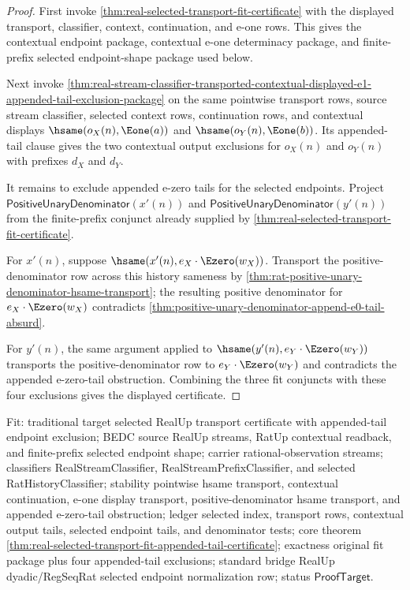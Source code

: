 \begin{proof}
First invoke
\autoref{thm:real-selected-transport-fit-certificate} with the displayed
transport, classifier, context, continuation, and e-one rows. This gives the
contextual endpoint package, contextual e-one determinacy package, and
finite-prefix selected endpoint-shape package used below.

Next invoke
\autoref{thm:real-stream-classifier-transported-contextual-displayed-e1-appended-tail-exclusion-package}
on the same pointwise transport rows, source stream classifier, selected context
rows, continuation rows, and contextual displays $\hsame(o_X(n),\Eone(a))$ and
$\hsame(o_Y(n),\Eone(b))$. Its appended-tail clause gives the two contextual
output exclusions for $o_X(n)$ and $o_Y(n)$ with prefixes $d_X$ and $d_Y$.

It remains to exclude appended e-zero tails for the selected endpoints. Project
$\mathsf{PositiveUnaryDenominator}(x'(n))$ and
$\mathsf{PositiveUnaryDenominator}(y'(n))$ from the finite-prefix conjunct
already supplied by \autoref{thm:real-selected-transport-fit-certificate}.

For $x'(n)$, suppose $\hsame(x'(n),e_X\cdot\Ezero(w_X))$. Transport the
positive-denominator row across this history sameness by
\autoref{thm:rat-positive-unary-denominator-hsame-transport}; the resulting
positive denominator for $e_X\cdot\Ezero(w_X)$ contradicts
\autoref{thm:positive-unary-denominator-append-e0-tail-absurd}.

For $y'(n)$, the same argument applied to
$\hsame(y'(n),e_Y\cdot\Ezero(w_Y))$ transports the positive-denominator row to
$e_Y\cdot\Ezero(w_Y)$ and contradicts the appended e-zero-tail obstruction.
Combining the three fit conjuncts with these four exclusions gives the displayed
certificate.
\end{proof}

Fit: traditional target selected RealUp transport certificate with appended-tail
endpoint exclusion; BEDC source RealUp streams, RatUp contextual readback, and
finite-prefix selected endpoint shape; carrier rational-observation streams;
classifiers RealStreamClassifier, RealStreamPrefixClassifier, and selected
RatHistoryClassifier; stability pointwise hsame transport, contextual
continuation, e-one display transport, positive-denominator hsame transport, and
appended e-zero-tail obstruction; ledger selected index, transport rows,
contextual output tails, selected endpoint tails, and denominator tests; core
theorem \autoref{thm:real-selected-transport-fit-appended-tail-certificate};
exactness original fit package plus four appended-tail exclusions; standard
bridge RealUp dyadic/RegSeqRat selected endpoint normalization row; status
$\mathsf{ProofTarget}$.

